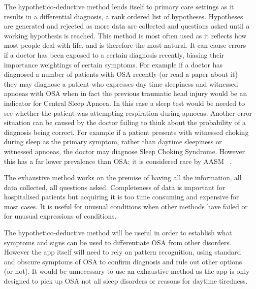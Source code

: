 The hypothetico-deductive method lends itself to primary care settings as it results in a differential diagnosis, a rank ordered list of hypotheses. Hypotheses are generated and rejected as more data are collected and questions asked until a working hypothesis is reached. This method is most often used as it reflects how most people deal with life, and is therefore the most natural. It can cause errors if a doctor has been exposed to a certain diagnosis recently, biasing their importance weightings of certain symptoms. For example if a doctor has diagnosed a number of patients with OSA recently (or read a paper about it) they may diagnose a patient who expresses day time sleepiness and witnessed apnoeas with OSA when in fact the previous traumatic head injury would be an indicator for Central Sleep Apnoea. In this case a sleep test would be needed to see whether the patient was attempting respiration during apnoeas. Another error situation can be caused by the doctor failing to think about the probability of a diagnosis being correct. For example if a patient presents with witnessed choking during sleep as the primary symptom, rather than daytime sleepiness or witnessed apnoeas, the doctor may diagnose Sleep Choking Syndrome. However this has a far lower prevalence than OSA; it is considered rare by AASM ~\cite{american2001international}.

The exhaustive method works on the premise of having all the information, all data collected, all questions asked. Completeness of data is important for hospitalised patients but acquiring it is too time consuming and expensive for most cases. It is useful for unusual conditions when other methods have failed or for unusual expressions of conditions. 

The hypothetico-deductive method will be useful in order to establish what symptoms and signs can be used to differentiate OSA from other disorders. However the app itself will need to rely on pattern recognition, using standard and obscure symptoms of OSA to confirm diagnosis and rule out other options (or not). It would be unnecessary to use an exhaustive method as the app is only designed to pick up OSA not all sleep disorders or reasons for daytime tiredness.
